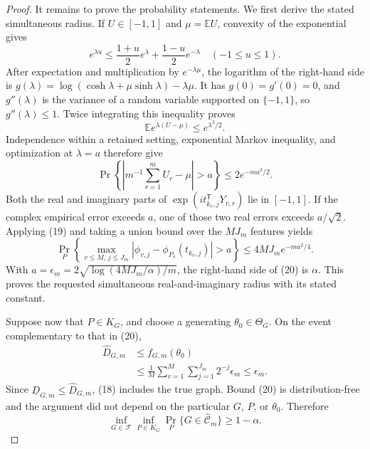 \documentclass{article}
\begin{document}
\begin{proof}
It remains to prove the probability statements.  We first derive the stated
simultaneous radius.  If \(U\in[-1,1]\) and \(\mu=\mathbb EU\), convexity of
the exponential gives
\[
 e^{\lambda u}\leq\frac{1+u}{2}e^\lambda
                     +\frac{1-u}{2}e^{-\lambda}
 \quad(-1\leq u\leq1).
\]
After expectation and multiplication by \(e^{-\lambda\mu}\), the logarithm
of the right-hand side is
\(g(\lambda)=\log(\cosh\lambda+\mu\sinh\lambda)-\lambda\mu\).
It has \(g(0)=g'(0)=0\), and \(g''(\lambda)\) is the variance of a random
variable supported on \(\{-1,1\}\), so \(g''(\lambda)\leq1\).  Twice
integrating this inequality proves
\[
 \mathbb E e^{\lambda(U-\mu)}\leq e^{\lambda^2/2}.
\]
Independence within a retained setting, exponential Markov inequality, and
optimization at \(\lambda=a\) therefore give
\[
 \Pr\left\{\left|m^{-1}\sum_{r=1}^mU_r-\mu\right|>a\right\}
 \leq2e^{-ma^2/2}.
 \tag{19}
\]
Both the real and imaginary parts of
\(\exp(i t_{k_v,j}^{\mathsf T}Y_{v,r})\) lie in \([-1,1]\).  If the complex
empirical error exceeds \(a\), one of those two real errors exceeds
\(a/\sqrt2\).  Applying (19) and taking a union bound over the \(MJ_m\)
features yields
\[
 \Pr_P\left\{
   \max_{v\leq M,\,j\leq J_m}
   |\widehat\phi_{v,j}-\phi_{P_v}(t_{k_v,j})|>a
 \right\}
 \leq4MJ_m e^{-ma^2/4}.
 \tag{20}
\]
With
\(a=\epsilon_m=2\sqrt{\log(4MJ_m/\alpha)/m}\), the right-hand side of
(20) is \(\alpha\).  This proves the requested simultaneous
real-and-imaginary radius with its stated constant.

Suppose now that \(P\in K_G\), and choose a generating
\(\theta_0\in\Theta_G\).  On the event complementary to that in (20),
\[
 \begin{split}
 \widehat D_{G,m}
 &\leq f_{G,m}(\theta_0)\\
 &\leq\frac1M\sum_{v=1}^M\sum_{j=1}^{J_m}2^{-j}\epsilon_m
 \leq\epsilon_m.
 \end{split}
 \tag{21}
\]
Since \(\underline D_{G,m}\leq\widehat D_{G,m}\), (18) includes the true
graph.  Bound (20) is distribution-free and the argument did not depend on
the particular \(G\), \(P\), or \(\theta_0\).  Therefore
\[
 \inf_{G\in\mathcal F}\inf_{P\in K_G}
 \Pr_P\{G\in\widehat{\mathcal C}_m\}\geq1-\alpha.
 \tag{22}
\]


\end{proof}
\end{document}
